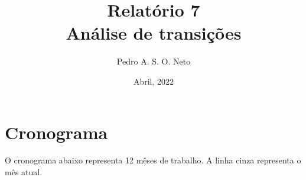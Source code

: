 \documentclass{article}
\title{Relatório 7 \\ Análise de transições}
\author{Pedro A. S. O. Neto}
\date{Abril, 2022}
\begin{document}
\maketitle

\section{Cronograma}

O cronograma abaixo representa 12 mêses de trabalho. A linha cinza representa o mês atual.

\begin{figure}[H]
\noindent{}
\end{figure}
\end{document}
